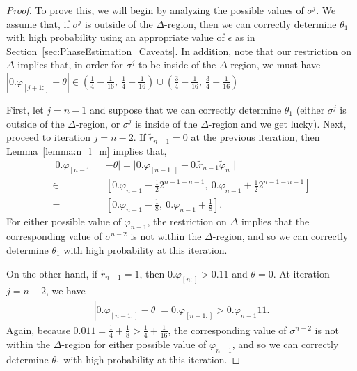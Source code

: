 \documentclass[aps,pra,showpacs,notitlepage,twocolumn,superscriptaddress,nofootinbib]{revtex4-1}
\begin{document}
\begin{proof}
To prove this, we will begin by analyzing the possible values of $\sigma^j$. We assume that, if $\sigma^j$ is outside of the $\Delta$-region, then we can correctly determine $\theta_1$ with high probability using an appropriate value of $\epsilon$ as in Section~\ref{sec:PhaseEstimation_Caveats}. In addition, note that our restriction on $\Delta$ implies that, in order for $\sigma^j$ to be inside of the $\Delta$-region, we must have $|0.\varphi_{[j+1:]} - \theta| \in (\frac{1}{4} - \frac{1}{16},\ \frac{1}{4} + \frac{1}{16}) \cup (\frac{3}{4} - \frac{1}{16},\ \frac{3}{4} + \frac{1}{16})$


First, let $j=n-1$ and suppose that we can correctly determine $\theta_1$ (either $\sigma^j$ is outside of the $\Delta$-region, or $\sigma^j$ is inside of the $\Delta$-region and we get lucky). Next, proceed to iteration $j=n-2$. If $\tilde{r}_{n-1} = 0$ at the previous iteration, then Lemma~\ref{lemma:n_l_m} implies that, 
\begin{equation}
\begin{split}
   |0.\varphi_{[n-1:]}& - \theta| = |0.\varphi_{[n-1:]} - 0.\tilde{r}_{n-1} \tilde{\varphi}_{n:}| \\
    \in &\left[0.\varphi_{n-1} - \frac{1}{2}2^{n-1-n-1},\ 0.\varphi_{n-1} + \frac{1}{2}2^{n-1-n-1} \right] \\
    = &\left[0.\varphi_{n-1} - \frac{1}{8},\ 0.\varphi_{n-1} + \frac{1}{8} \right].
\end{split}
\end{equation}
For either possible value of $\varphi_{n-1}$, the restriction on $\Delta$ implies that the corresponding value of $\sigma^{n-2}$ is not within the $\Delta$-region, and so we can correctly determine $\theta_1$ with high probability at this iteration. 

On the other hand, if $\tilde{r}_{n-1} = 1$, then $0.\varphi_{[n:]} > 0.11$ and $\theta = 0$. At iteration $j=n-2$, we have
\begin{equation}
\begin{gathered}
    |0.\varphi_{[n-1:]} - \theta| = 0.\varphi_{[n-1:]} > 0.\varphi_{n-1}11.
\end{gathered}
\end{equation}
Again, because $0.011 = \frac{1}{4} + \frac{1}{8} > \frac{1}{4} + \frac{1}{16}$, the corresponding value of $\sigma^{n-2}$ is not within the $\Delta$-region for either possible value of $\varphi_{n-1}$, and so we can correctly determine $\theta_1$ with high probability at this iteration.


\end{proof}
\end{document}
